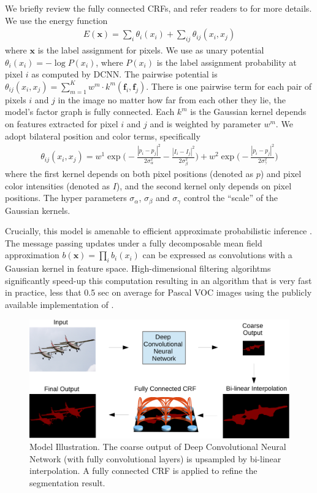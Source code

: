 We briefly review the fully connected CRFs, and refer readers to
\citep{krahenbuhl2011efficient} for more details. We use the energy function
\begin{align}
  E(\boldsymbol{x}) = \sum_i \theta_i(x_i) + \sum_{ij} \theta_{ij}(x_i, x_j)
\end{align}
where $\boldsymbol{x}$ is the label assignment for pixels. We use as unary
potential $\theta_i(x_i) = - \log P(x_i)$, where $P(x_i)$ is the label
assignment probability at pixel $i$ as computed by DCNN. The pairwise
potential is $\theta_{ij}(x_i, x_j) = \sum_{m=1}^{K} w^m \cdot
k^m(\boldsymbol{f}_i, \boldsymbol{f}_j)$. There is one pairwise term for each
pair of pixels $i$ and $j$ in the image no matter how far from each other they
lie, \ie the model's factor graph is fully connected. Each $k^m$ is the
Gaussian kernel depends on features extracted for pixel $i$ and $j$ and is
weighted by parameter $w^m$. We adopt bilateral position and color terms,
specifically
\begin{align}
  \theta_{ij}(x_i, x_j) = w^1 \exp \Big(-\frac{|p_i-p_j|^2}{2\sigma_\alpha^2} -\frac{|I_i-I_j|^2}{2\sigma_\beta^2} \Big) + w^2 \exp \Big(-\frac{|p_i-p_j|^2}{2\sigma_\gamma^2}\Big)
\end{align}
where the first kernel depends on both pixel positions (denoted as $p$) and
pixel color intensities (denoted as $I$), and the second kernel only depends
on pixel positions. The hyper parameters $\sigma_\alpha$, $\sigma_\beta$ and
$\sigma_\gamma$ control the ``scale'' of the Gaussian kernels.

Crucially, this model is amenable to efficient approximate probabilistic
inference \citep{krahenbuhl2011efficient}. The message passing updates under a
fully decomposable mean field approximation $b(\boldsymbol{x}) = \prod_i
b_i(x_i)$ can be expressed as convolutions with a Gaussian kernel in feature
space. High-dimensional filtering algorihtms \citep{adams2010fast}
significantly speed-up this computation resulting in an algorithm that is very
fast in practice, less that 0.5 sec on average for Pascal VOC images using the
publicly available implementation of \citep{krahenbuhl2011efficient}.

\begin{figure}
  \centering
  \includegraphics[width=1\linewidth]{fig/model_illustration2.pdf}
  \caption{Model Illustration. The coarse output of Deep Convolutional Neural
    Network (with fully convolutional layers) is upsampled by bi-linear
    interpolation. A fully connected CRF is applied to refine the segmentation
    result.}
  \label{fig:ModelIllustration}
\end{figure}

